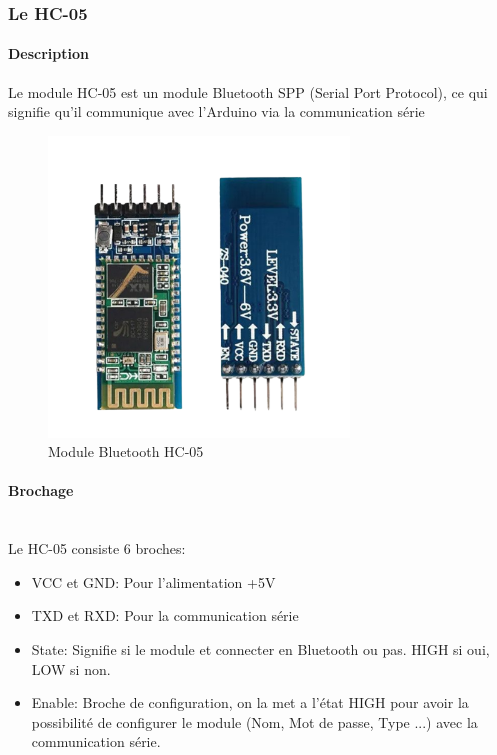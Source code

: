 \subsubsection{Le HC-05}

\paragraph{Description}
Le module HC-05 est un module Bluetooth SPP (Serial Port Protocol), ce qui signifie qu’il communique avec l’Arduino via la communication série

\begin{figure}[!htbp]
    \centering
    \includegraphics[width=8cm]{assets/HC-05/pinout.png}
    \caption{Module Bluetooth HC-05}
\end{figure}

\FloatBarrier

\paragraph{Brochage}\mbox{}\\
Le HC-05 consiste 6 broches:
\begin{itemize}
    \item VCC et GND: Pour l'alimentation +5V
    \item TXD et RXD: Pour la communication série
    \item State: Signifie si le module et connecter en Bluetooth ou pas. HIGH si oui, LOW si non.
    \item Enable: Broche de configuration, on la met a l'état HIGH pour avoir la possibilité de configurer le module (Nom, Mot de passe, Type ...) avec la communication série.
\end{itemize}


